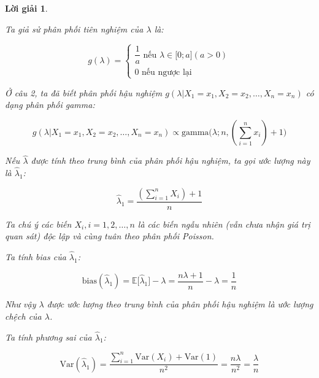 \documentclass[14pt, a4paper]{article}
\theoremstyle{sltheorem}
\theoremstyle{soltheorem}
\newtheorem*{loigiai}{Lời giải}
\begin{document}
\begin{loigiai}
\begin{enumerate}
\begin{itemize}
            Ta giả sử phân phối tiên nghiệm của $\lambda$ là:

            \begin{equation*}
                g(\lambda) = \begin{cases}
                    \dfrac{1}{a} \text{ nếu } \lambda \in \lbrack 0; a\rbrack (a > 0) \\
                    0 \text{ nếu ngược lại}
                \end{cases}
            \end{equation*}

            Ở câu 2, ta đã biết phân phối hậu nghiệm $g(\lambda \vert X_1 =x_1, X_2=x_2, \dots, X_n=x_n)$ có dạng phân phối gamma:

            \begin{equation*}
                g(\lambda \vert X_1 =x_1, X_2=x_2, \dots, X_n=x_n) \propto \text{gamma}\big(\lambda; n, (\sum_{i=1}^n x_i) + 1\big)
            \end{equation*}

            Nếu $\hat{\lambda}$ được tính theo trung bình của phân phối hậu nghiệm,
            ta gọi ước lượng này là $\hat{\lambda}_1$:

            \begin{equation*}
                \hat{\lambda}_1 = \dfrac{(\sum_{i=1}^n X_i) + 1}{n}
            \end{equation*}

            Ta chú ý các biến $X_i, i=1,2,\dots,n$ là các biến ngẫu nhiên (vẫn chưa nhận giá trị quan sát) độc lập và cùng tuân theo phân phối Poisson.

            Ta tính bias của $\hat{\lambda}_1$:

            \begin{equation*}
                \text{bias}(\hat{\lambda}_1) = \mathbb{E} \lbrack \hat{\lambda}_1 \rbrack - \lambda = \dfrac{n\lambda + 1}{n} - \lambda = \dfrac{1}{n}
            \end{equation*}

            Như vậy $\lambda$ được ước lượng theo trung bình của phân phối hậu nghiệm là ước lượng chệch của $\lambda$.

            Ta tính phương sai của $\hat{\lambda}_1$:
            
            \begin{equation*}
                \text{Var}(\hat{\lambda}_1) = \dfrac{\sum_{i=1}^n \text{Var}(X_i) + \text{Var}(1)}{n^2} = \dfrac{n\lambda}{n^2} = \dfrac{\lambda}{n}
            \end{equation*}


\end{itemize}
\end{enumerate}
\end{loigiai}
\end{document}
